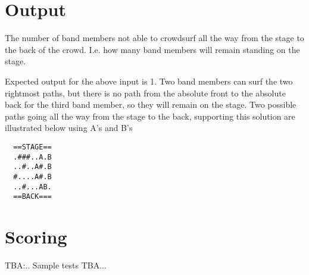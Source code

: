 \section*{Output}

The number of band members not able to crowdsurf all the way from the stage to the back of the crowd. I.e. how many band members will remain standing on the stage.

Expected output for the above input is 1. Two band members can surf the two rightmost paths, but there is no path from the absolute front to the absolute back for the third band member, so they will remain on the stage.
Two possible paths going all the way from the stage to the back, supporting this solution are illustrated below using A's and B's
\begin{verbatim}
  ==STAGE==
  .###..A.B
  ..#..A#.B
  #....A#.B
  ..#...AB.
  ==BACK===
  \end{verbatim}

\section*{Scoring}

TBA:..
Sample tests TBA...

